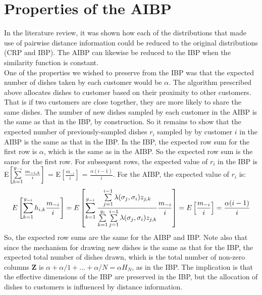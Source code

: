 \section{Properties of the AIBP}
In the literature review, it was shown how each of the distributions that made
use of pairwise distance information could be reduced to the original
distributions (CRP and IBP). The AIBP can likewise be reduced to the IBP when
the similarity function is constant.\\
\noindent
One of the properties we wished to preserve from the IBP was that the expected
number of dishes taken by each customer would be $\alpha$. The algorithm
prescribed above allocates dishes to customer based on their proximity to other
customers.  That is if two customers are close together, they are more likely
to share the same dishes. The number of new dishes sampled by each customer in
the AIBP is the same as that in the IBP, by construction. So it remains to show
that the expected number of previously-sampled dishes $r_i$ sampled by by
customer $i$ in the AIBP is the same as that in the IBP. In the IBP, the
expected row sum for the first row is $\alpha$, which is the same as in the
AIBP. So the expected row sum is the same for the first row. For subsequent
rows, the expected value of $r_i$ in the IBP is E$\left[\sum\limits_{k=1}^{y_{-i}}
\frac{m_{-i,k}}{i}\right]$ = E$\left[\frac{m_{-i}}{i}\right]$ =
$\frac{\alpha(i-1)}{i}$. For the AIBP, the expected value of $r_i$ is:
\[
  E\left[\sum\limits_{k=1}^{y_{-i}} h_{i,k} \frac{m_{-i}}{i}\right] = 
  E\left[\sum\limits_{k=1}^{y_{-i}}\displaystyle\frac{\sum\limits_{j=1}^{i-1}\lambda(\sigma_j,\sigma_i)z_{j,k}} {\sum\limits_{k=1}^{y_i}\sum\limits_{j=1}^{i-1}\lambda(\sigma_j,\sigma_i)z_{j,k}} \frac{m_{-i}}{i}\right] = 
  E\left[\frac{m_{-i}}{i}\right] = \frac{\alpha(i-1)}{i}
\]
So, the expected row sums are the same for the AIBP and IBP. Note also that
since the mechanism for drawing new dishes is the same as that for the IBP, the
expected total number of dishes drawn, which is the total number of non-zero
columns $\bm Z$ is $\alpha+\alpha/1+...+\alpha/N = \alpha H_N$, as in the IBP. 
The implication is that the effective dimensions of the IBP are preserved in the
IBP, but the allocation of dishes to customers is influenced by distance 
information.\\

